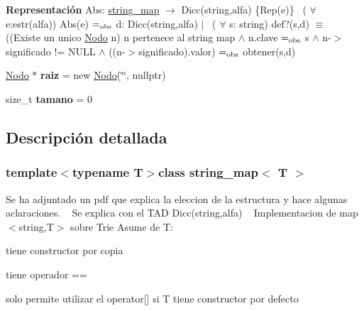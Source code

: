 \begin{Indent}{\bf Representación}
{Abs\+: \hyperlink{classstring__map}{string\+\_\+map} $\to$ Dicc(string,alfa) \{Rep(e)\}~\newline
 ( $\forall$ e\+:estr(alfa)) Abs(e) $=_{\rm obs}$ d\+: Dicc(string,alfa) $\vert$~\newline
 ( $\forall$ s\+: string) def?(s,d) $\equiv$ ((Existe un unico \hyperlink{structstring__map_1_1Nodo}{Nodo} n) n pertenece al string map $\land$ n.\+clave $=_{\rm obs}$ s $\land$ n-\/$>$significado != N\+U\+L\+L $\land$ ((n-\/$>$significado).valor) $=_{\rm obs}$ obtener(s,d) }\begin{DoxyCompactItemize}
\item 
\hypertarget{classstring__map_a26da8481a5a55413d82244e98ba3b923}{\hyperlink{structstring__map_1_1Nodo}{Nodo} $\ast$ {\bfseries raiz} = new \hyperlink{structstring__map_1_1Nodo}{Nodo}(\char`\"{}\char`\"{}, nullptr)}\label{classstring__map_a26da8481a5a55413d82244e98ba3b923}

\item 
\hypertarget{classstring__map_aa6d1368586c5ab95f1ad0fc39723bf72}{size\+\_\+t {\bfseries tamano} = 0}\label{classstring__map_aa6d1368586c5ab95f1ad0fc39723bf72}

\end{DoxyCompactItemize}
\end{Indent}


\subsection{Descripción detallada}
\subsubsection*{template$<$typename T$>$class string\+\_\+map$<$ T $>$}

Se ha adjuntado un pdf que explica la eleccion de la estructura y hace algunas aclaraciones. ~\newline
 Se explica con el T\+A\+D Dicc(string,alfa) ~\newline
Implementacion de map$<$string,\+T$>$ sobre Trie Asume de T\+:
\begin{DoxyItemize}
\item tiene constructor por copia
\item tiene operador ==
\item solo permite utilizar el operator\mbox{[}\mbox{]} si T tiene constructor por defecto 
\end{DoxyItemize}

